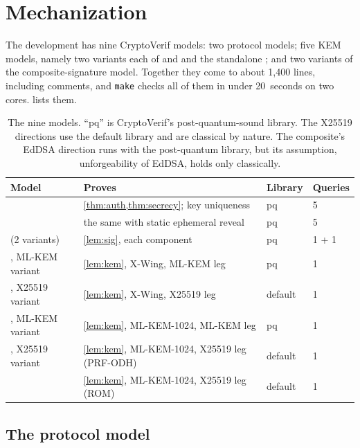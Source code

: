\section{Mechanization}\label{sec:mech}

The development has nine CryptoVerif models: two protocol models; five KEM
models, namely two variants each of  and
 and the standalone ;
and two variants of the composite-signature model. Together they come
to about 1,400 lines, including comments, and \texttt{make} checks all of them
in under 20~seconds on two cores.  lists them.

\begin{table}[t]
\centering
\small
\begin{tabularx}{\linewidth}{@{}lLll@{}}
\toprule
Model & Proves & Library & Queries\\
\midrule
{} & \cref{thm:auth,thm:secrecy}; key uniqueness & pq & 5\\
 & the same with static ephemeral reveal & pq & 5\\
 (2 variants) & \cref{lem:sig}, each component & pq & 1 + 1\\
, ML-KEM variant & \cref{lem:kem}, X-Wing, ML-KEM leg & pq & 1\\
, X25519 variant & \cref{lem:kem}, X-Wing, X25519 leg & default & 1\\
, ML-KEM variant & \cref{lem:kem}, ML-KEM-1024, ML-KEM leg & pq & 1\\
, X25519 variant & \cref{lem:kem}, ML-KEM-1024, X25519 leg (PRF-ODH) & default & 1\\
 & \cref{lem:kem}, ML-KEM-1024, X25519 leg (ROM) & default & 1\\
\bottomrule
\end{tabularx}
\caption{The nine models. ``pq'' is CryptoVerif's post-quantum-sound library.
The X25519 directions use the default library and are classical by nature.
The composite's EdDSA direction runs with the post-quantum library, but its
assumption, unforgeability of EdDSA, holds only classically.}
\label{tab:models}
\end{table}

\subsection{The protocol model}\label{sec:mech:protocol}

